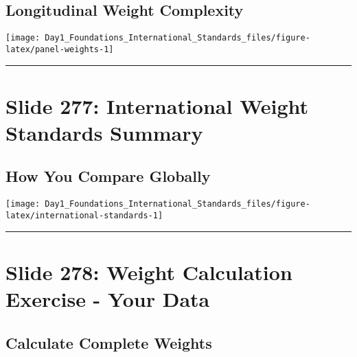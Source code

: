 \documentclass[
]{article}
\begin{document}
\subsection{Longitudinal Weight
Complexity}\label{longitudinal-weight-complexity}

\texttt{[image: Day1\_Foundations\_International\_Standards\_files/figure-latex/panel-weights-1]}

\begin{center}\rule{0.5\linewidth}{0.5pt}\end{center}

\section{Slide 277: International Weight Standards
Summary}\label{slide-277-international-weight-standards-summary}

\subsection{How You Compare Globally}\label{how-you-compare-globally}

\texttt{[image: Day1\_Foundations\_International\_Standards\_files/figure-latex/international-standards-1]}

\begin{center}\rule{0.5\linewidth}{0.5pt}\end{center}

\section{Slide 278: Weight Calculation Exercise - Your
Data}\label{slide-278-weight-calculation-exercise---your-data}

\subsection{Calculate Complete
Weights}\label{calculate-complete-weights}
\end{document}
